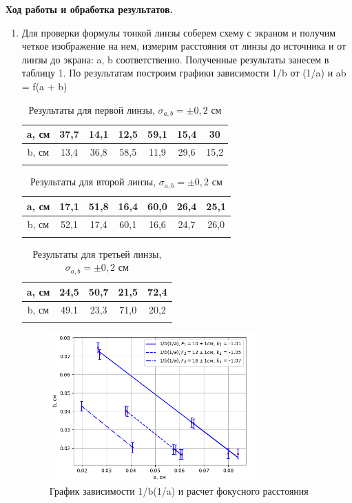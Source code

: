 \documentclass[a4paper, 12pt]{article}%
\begin{document}
	\newpage
	
	\textbf{Ход работы и обработка результатов.}\\
	
	\begin{enumerate}
	
	\item Для проверки формулы тонкой линзы соберем схему с экраном и получим четкое изображение на нем, измерим расстояния от линзы до источника и от линзы до экрана: a, b соответственно. Полученные результаты занесем в таблицу 1. По результатам построим графики зависимости 1/b от (1/a) и ab = f(a + b)
	
	\begin{longtable}{|c|c|c|c|c|c|c|}
		\hline
		a, см & 37,7 & 14,1 & 12,5 & 59,1 & 15,4 & 30 \\ \hline
		b, см & 13,4 & 36,8 & 58,5 & 11,9 & 29,6 & 15,2 \\ \hline
		\caption{Результаты для первой линзы, $\sigma_{a,b} = \pm 0,2$ см}
	\end{longtable}
	
	\begin{longtable}{|c|c|c|c|c|c|c|}
		\hline
		a, см & 17,1 & 51,8 & 16,4 & 60,0 & 26,4 & 25,1 \\ \hline
		b, см & 52,1 & 17,4 & 60,1 & 16,6 & 24,7 & 26,0 \\ \hline
		\caption{Результаты для второй линзы, $\sigma_{a,b} = \pm 0,2$ см}
	\end{longtable}
	
	\begin{longtable}{|c|c|c|c|c|}
		\hline
		a, см & 24,5 & 50,7 & 21,5 & 72,4 \\ \hline
		b, см & 49.1 & 23,3 & 71,0 & 20,2\\ \hline
		\caption{Результаты для третьей линзы, $\sigma_{a,b} = \pm 0,2$ см}
	\end{longtable}
	
	\begin{figure}[H]
		\begin{center}
			\includegraphics[width = 0.75\textwidth]{a(b).png}
			\caption{График зависимости 1/b(1/a) и расчет фокусного расстояния}
		\end{center}
	\end{figure}  
	

\end{enumerate}
\end{document}
